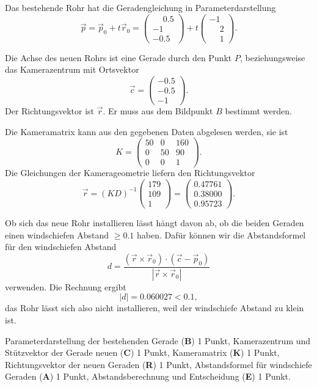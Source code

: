 \begin{loesung}
Das bestehende Rohr hat die Geradengleichung in Parameterdarstellung
\[
\vec p
=
\vec p_0
+
t\vec r_0
=
\begin{pmatrix}
\phantom{-}0.5\\
-1\phantom{.0}\\
-0.5
\end{pmatrix}
+t\begin{pmatrix}
-1\\
\phantom{-}2\\
\phantom{-}1
\end{pmatrix}.
\]

Die Achse des neuen Rohrs ist eine Gerade durch den Punkt $P$, 
beziehungsweise das Kamerazentrum mit Ortsvektor
\[
\vec c
=
\begin{pmatrix}
-0.5\\
-0.5\\
-1\phantom{.0}
\end{pmatrix}.
\]
Der Richtungsvektor ist $\vec r$. Er muss aus dem Bildpunkt $B$
bestimmt werden.

Die Kameramatrix kann aus den gegebenen Daten abgelesen werden, 
sie ist
\[
K
=
\begin{pmatrix}
50& 0&160\\
 0&50& 90\\
 0& 0&  1
\end{pmatrix}.
\]
Die Gleichungen der Kamerageometrie liefern den Richtungsvektor
\[
\vec r
=
(KD)^{-1}\begin{pmatrix}179\\109\\1\end{pmatrix}
=
\begin{pmatrix}
   0.47761 \\
   0.38000 \\
   0.95723
\end{pmatrix}.
\]

Ob sich das neue Rohr installieren lässt hängt davon ab, ob die beiden
Geraden einen windschiefen Abstand $\ge 0.1$ haben.
Dafür können wir die Abstandsformel für den windschiefen Abstand
\[
d
=
\frac{(\vec r\times\vec r_0)\cdot (\vec c - \vec p_0)}{|\vec r\times \vec r_0|}
\]
verwenden.
Die Rechnung ergibt
\[
|d| = 0.060027 < 0.1,
\]
das Rohr lässt sich also nicht installieren, weil der windschiefe Abstand
zu klein ist.
\end{loesung}

\begin{bewertung}
Parameterdarstellung der bestehenden Gerade ({\bf B}) 1 Punkt,
Kamerazentrum und Stützvektor der Gerade neuen ({\bf C}) 1 Punkt,
Kameramatrix ({\bf K}) 1 Punkt,
Richtungsvektor der neuen Geraden ({\bf R}) 1 Punkt,
Abstandsformel für windschiefe Geraden ({\bf A}) 1 Punkt,
Abstandsberechnung und Entscheidung ({\bf E}) 1 Punkt.
\end{bewertung}


